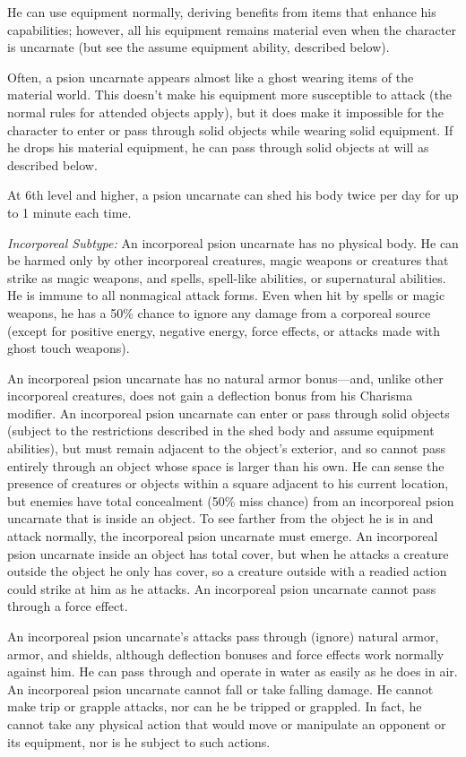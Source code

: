 {He can use equipment normally, deriving benefits from items that enhance his capabilities; however, all his equipment remains material even when the character is uncarnate (but see the assume equipment ability, described below).

Often, a psion uncarnate appears almost like a ghost wearing items of the material world. This doesn't make his equipment more susceptible to attack (the normal rules for attended objects apply), but it does make it impossible for the character to enter or pass through solid objects while wearing solid equipment. If he drops his material equipment, he can pass through solid objects at will as described below.

At 6th level and higher, a psion uncarnate can shed his body twice per day for up to 1 minute each time.

\textit{Incorporeal Subtype:} An incorporeal psion uncarnate has no physical body. He can be harmed only by other incorporeal creatures, magic weapons or creatures that strike as magic weapons, and spells, spell-like abilities, or supernatural abilities. He is immune to all nonmagical attack forms. Even when hit by spells or magic weapons, he has a 50\% chance to ignore any damage from a corporeal source (except for positive energy, negative energy, force effects, or attacks made with ghost touch weapons).

An incorporeal psion uncarnate has no natural armor bonus---and, unlike other incorporeal creatures, does not gain a deflection bonus from his Charisma modifier. An incorporeal psion uncarnate can enter or pass through solid objects (subject to the restrictions described in the shed body and assume equipment abilities), but must remain adjacent to the object's exterior, and so cannot pass entirely through an object whose space is larger than his own. He can sense the presence of creatures or objects within a square adjacent to his current location, but enemies have total concealment (50\% miss chance) from an incorporeal psion uncarnate that is inside an object. To see farther from the object he is in and attack normally, the incorporeal psion uncarnate must emerge. An incorporeal psion uncarnate inside an object has total cover, but when he attacks a creature outside the object he only has cover, so a creature outside with a readied action could strike at him as he attacks. An incorporeal psion uncarnate cannot pass through a force effect.

An incorporeal psion uncarnate's attacks pass through (ignore) natural armor, armor, and shields, although deflection bonuses and force effects work normally against him. He can pass through and operate in water as easily as he does in air. An incorporeal psion uncarnate cannot fall or take falling damage. He cannot make trip or grapple attacks, nor can he be tripped or grappled. In fact, he cannot take any physical action that would move or manipulate an opponent or its equipment, nor is he subject to such actions.

}
